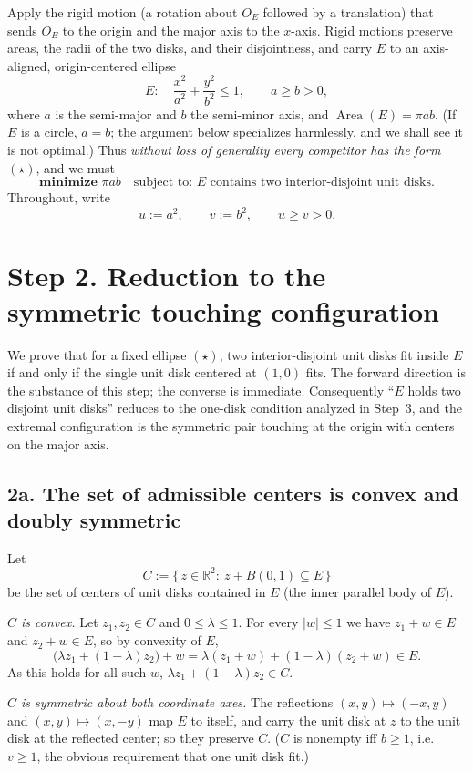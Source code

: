 \documentclass[11pt]{article}
\newcommand{\R}{\mathbb{R}}
\DeclareMathOperator{\Area}{Area}
\begin{document}
Apply the rigid motion (a rotation about $O_E$ followed by a translation) that sends $O_E$
to the origin and the major axis to the $x$-axis. Rigid motions preserve areas, the radii
of the two disks, and their disjointness, and carry $E$ to an axis-aligned, origin-centered
ellipse
\begin{equation}
E:\quad \frac{x^2}{a^2}+\frac{y^2}{b^2}\le 1,\qquad a\ge b>0, \tag{$\star$}
\end{equation}
where $a$ is the semi-major and $b$ the semi-minor axis, and $\Area(E)=\pi ab$. (If $E$ is a
circle, $a=b$; the argument below specializes harmlessly, and we shall see it is not
optimal.) Thus \emph{without loss of generality every competitor has the form $(\star)$},
and we must
\[
\textbf{minimize } \pi ab \quad\text{subject to: $E$ contains two interior-disjoint unit disks.}
\]
Throughout, write
\[
u:=a^2,\qquad v:=b^2,\qquad u\ge v>0 .
\]

\section*{Step 2. Reduction to the symmetric touching configuration}

We prove that for a fixed ellipse $(\star)$, two interior-disjoint unit disks fit inside $E$ if and
only if the single unit disk centered at $(1,0)$ fits. The forward direction is the substance of this
step; the converse is immediate. Consequently ``$E$ holds two disjoint unit disks'' reduces to the
one-disk condition analyzed in Step~3, and the extremal configuration is the symmetric pair touching
at the origin with centers on the major axis.

\subsection*{2a. The set of admissible centers is convex and doubly symmetric}

Let
\[
  C:=\{\,z\in\R^2:\ z+B(0,1)\subseteq E\,\}
\]
be the set of centers of unit disks contained in $E$ (the inner parallel body of $E$).

\emph{$C$ is convex.} Let $z_1,z_2\in C$ and $0\le\lambda\le1$. For every $|w|\le1$ we have
$z_1+w\in E$ and $z_2+w\in E$, so by convexity of $E$,
\[
  \bigl(\lambda z_1+(1-\lambda)z_2\bigr)+w
   =\lambda(z_1+w)+(1-\lambda)(z_2+w)\in E .
\]
As this holds for all such $w$, $\lambda z_1+(1-\lambda)z_2\in C$.

\emph{$C$ is symmetric about both coordinate axes.} The reflections $(x,y)\mapsto(-x,y)$ and
$(x,y)\mapsto(x,-y)$ map $E$ to itself, and carry the unit disk at $z$ to the unit disk at the
reflected center; so they preserve $C$. ($C$ is nonempty iff $b\ge1$, i.e.\ $v\ge1$, the obvious
requirement that one unit disk fit.)
\end{document}
